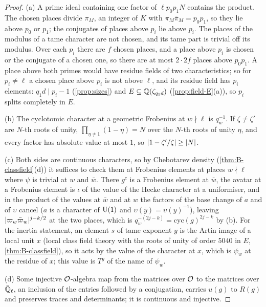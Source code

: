 \begin{proof}
(a) A prime ideal containing one factor of $\ell p_0p_1N$ contains the product. The chosen places divide $\pi_M$, an integer of $K$ with $\pi_M\bar\pi_M=p_0p_1$, so they lie above $p_0$ or $p_1$; the conjugates of places
above $p_i$ lie above $p_i$. The places of the modulus of a tame character are not chosen, and its tame part is trivial off its modulus. Over each $p_i$ there are $f$ chosen places, and a place above $p_i$ is chosen or the
conjugate of a chosen one, so there are at most $2\cdot2f$ places above $p_0p_1$. A place above both primes would have residue fields of two characteristics; so for $p_i\ne\ell$ a chosen place above $p_i$ is not above $\ell$,
and its residue field has $p_i$ elements: $q_1d\mid p_i-1$ (\cref{prop:sizes}) and $E\subseteq\mathbb{Q}(\zeta_{q_1d})$ (\cref{prop:field-E}(a)), so $p_i$ splits completely in $E$.

(b) The cyclotomic character at a geometric Frobenius at $w\nmid\ell$ is $q_w^{-1}$. If $\zeta\ne\zeta'$ are $N$-th roots of unity, $\prod_{\eta\ne1}(1-\eta)=N$ over the $N$-th roots of unity $\eta$, and every factor has absolute value at
most $1$, so $\lvert 1-\zeta'/\zeta\rvert\ge\lvert N\rvert$.

(c) Both sides are continuous characters, so by Chebotarev density (\cref{thm:B-classfield}(d)) it suffices to check them at Frobenius elements at places $w\nmid\ell$ where $\psi$ is trivial at $w$ and $\bar w$. There
$g^c$ is a Frobenius element at $\bar w$, the avatar at a Frobenius element is $\iota$ of the value of the Hecke character at a uniformiser, and in the product of the values at $\bar w$ and at $w$ the factors of the base
change of $a$ and of $\upsilon$ cancel ($a$ is a character of $\operatorname{U}(1)$ and $\upsilon(\bar y)=\upsilon(y)^{-1}$), leaving $\lvert \varpi_w\bar\varpi_w\rvert^{j-k/2}$ at the two places, which is $q_w^{-(2j-k)}=\mathrm{cyc}(g)^{2j-k}$ by (b). For the
inertia statement, an element $s$ of tame exponent $y$ is the Artin image of a local unit $x$ (local class field theory with the roots of unity of order $5040$ in $E$, \cref{thm:B-classfield}), so it acts by the value of the
character at $x$, which is $\psi_w$ at the residue of $x$; this value is $T^y$ of the name of $\psi_w$.

(d) Some injective $\mathcal{O}$-algebra map from the matrices over $\mathcal{O}$ to the matrices over $\bar{\mathbb{Q}}_\ell$, an inclusion of the entries followed by a conjugation, carries $u(g)$ to $R(g)$ and preserves traces and determinants; it is
continuous and injective.
\end{proof}


